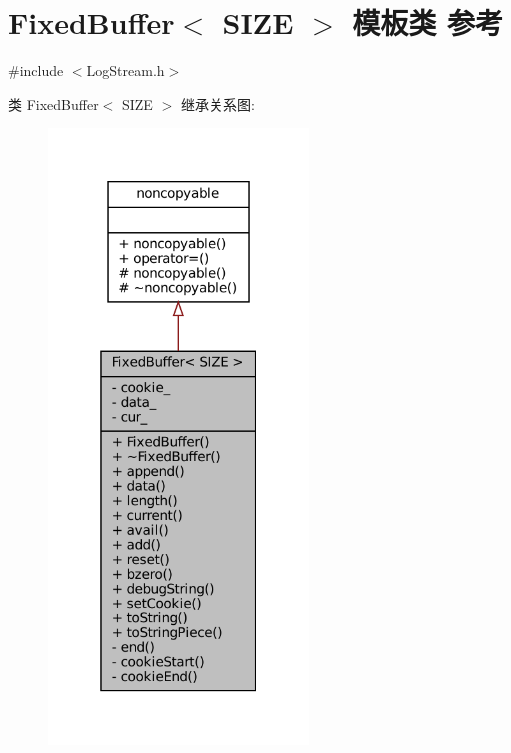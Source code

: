 \hypertarget{classmuduo_1_1detail_1_1FixedBuffer}{}\section{Fixed\+Buffer$<$ S\+I\+ZE $>$ 模板类 参考}
\label{classmuduo_1_1detail_1_1FixedBuffer}


{\ttfamily \#include $<$Log\+Stream.\+h$>$}



类 Fixed\+Buffer$<$ S\+I\+ZE $>$ 继承关系图\+:
\nopagebreak
\begin{figure}[H]
\begin{center}
\leavevmode
\includegraphics[width=196pt]{classmuduo_1_1detail_1_1FixedBuffer__inherit__graph}
\end{center}
\end{figure}


